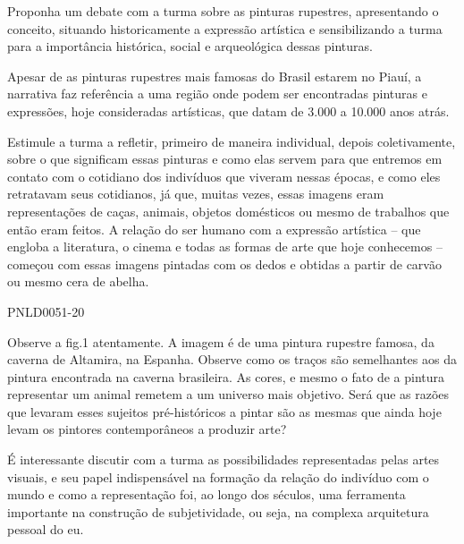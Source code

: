 \documentclass[12pt]{extarticle}
\begin{document}
Proponha um debate com a turma sobre as pinturas rupestres,
  apresentando o conceito, situando historicamente a expressão artística
  e sensibilizando a turma para a importância histórica, social e
  arqueológica dessas pinturas.

  Apesar de as pinturas rupestres mais famosas do Brasil estarem no
  Piauí, a narrativa faz referência a uma região onde podem ser
  encontradas pinturas e expressões, hoje consideradas artísticas, que
  datam de 3.000 a 10.000 anos atrás.

  Estimule a turma a refletir, primeiro de maneira individual, depois
  coletivamente, sobre o que significam essas pinturas e como elas
  servem para que entremos em contato com o cotidiano dos indivíduos que
  viveram nessas épocas, e como eles retratavam seus cotidianos, já que,
  muitas vezes, essas imagens eram representações de caças, animais,
  objetos domésticos ou mesmo de trabalhos que então eram feitos. A
  relação do ser humano com a expressão artística -- que engloba a
  literatura, o cinema e todas as formas de arte que hoje conhecemos --
  começou com essas imagens pintadas com os dedos e obtidas a partir de
  carvão ou mesmo cera de abelha.


%
{PNLD0051-20} 

Observe a fig.1 atentamente. 
  A imagem é de uma pintura rupestre famosa, da caverna de Altamira, na
  Espanha. Observe como os traços são semelhantes aos da pintura
  encontrada na caverna brasileira. As cores, e mesmo o fato de a
  pintura representar um animal remetem a um universo mais objetivo.
  Será que as razões que levaram esses sujeitos pré-históricos a pintar
  são as mesmas que ainda hoje levam os pintores contemporâneos a
  produzir arte?

  É interessante discutir com a turma as possibilidades representadas
  pelas artes visuais, e seu papel indispensável na formação da relação
  do indivíduo com o mundo e como a representação foi, ao longo dos
  séculos, uma ferramenta importante na construção de subjetividade, ou
  seja, na complexa arquitetura pessoal do eu.
\end{document}
